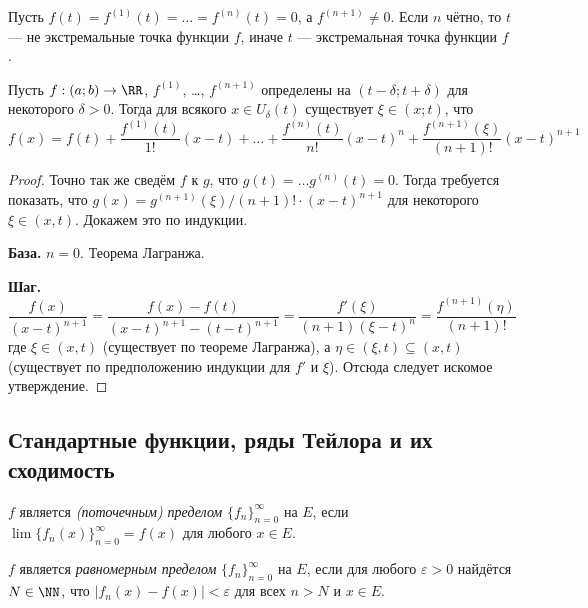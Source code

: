 \documentclass[12pt,a4paper]{article}
\begin{document}
    \begin{theorem}
        Пусть $f(t) = f^{(1)}(t) = \dots = f^{(n)}(t) = 0$, а $f^{(n+1)} \neq 0$. Если $n$ чётно, то $t$ --- не экстремальные точка функции $f$, иначе $t$ --- экстремальная точка функции $f$.
    \end{theorem}

    \begin{theorem}\label{finite_Teylor_series_theorem_engineers_variation}
        Пусть $f: (a; b) \to \RR$, $f^{(1)}$, \dots, $f^{(n+1)}$ определены на $(t-\delta; t+\delta)$ для некоторого $\delta > 0$. Тогда для всякого $x \in U_\delta(t)$ существует $\xi \in (x; t)$, что
        \[f(x) = f(t) + \frac{f^{(1)}(t)}{1!}(x-t) + \dots + \frac{f^{(n)}(t)}{n!}(x-t)^n + \frac{f^{(n+1)}(\xi)}{(n+1)!}(x-t)^{n+1}\]
    \end{theorem}

    \begin{proof}
        Точно так же сведём $f$ к $g$, что $g(t) = \dots g^{(n)}(t) = 0$. Тогда требуется показать, что $g(x) = g^{(n+1)}(\xi)/(n+1)! \cdot (x-t)^{n+1}$ для некоторого $\xi \in (x, t)$. Докажем это по индукции.

        \textbf{База.} $n=0$. Теорема Лагранжа.

        \textbf{Шаг.}
        \[\frac{f(x)}{(x-t)^{n+1}} = \frac{f(x) - f(t)}{(x-t)^{n+1} - (t-t)^{n+1}} = \frac{f'(\xi)}{(n+1)(\xi - t)^{n}} = \frac{f^{(n+1)}(\eta)}{(n+1)!}\]
        где $\xi \in (x, t)$ (существует по теореме Лагранжа), а $\eta \in (\xi, t) \subseteq (x, t)$ (существует по предположению индукции для $f'$ и $\xi$). Отсюда следует искомое утверждение.
    \end{proof}

    \subsection{Стандартные функции, ряды Тейлора и их сходимость}


    \begin{definition}
        $f$ является \emph{(поточечным) пределом} $\{f_n\}_{n=0}^\infty$ на $E$, если $\lim \{f_n(x)\}_{n=0}^\infty = f(x)$ для любого $x \in E$.
    \end{definition}

    \begin{definition}
        $f$ является \emph{равномерным пределом} $\{f_n\}_{n=0}^\infty$ на $E$, если для любого $\varepsilon > 0$ найдётся $N \in \NN$, что $|f_n(x) - f(x)| < \varepsilon$ для всех $n > N$ и $x \in E$.
    \end{definition}
\end{document}

